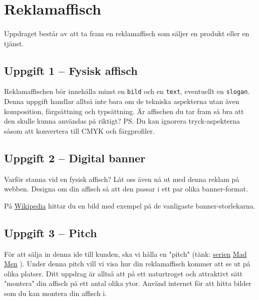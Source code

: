 \documentclass{article}
\begin{document}
  \newpage
  \section{Reklamaffisch}
    \paragraph{}
    Uppdraget består av att ta fram en reklamaffisch som säljer en produkt eller en tjänst.

    \subsection*{ Uppgift 1 -- Fysisk affisch}
      Reklamaffischen bör innehålla minst en \texttt{bild} och en \texttt{text}, eventuellt en \texttt{slogan}. Denna uppgift handlar alltså inte bara om de tekniska aspekterna utan även komposition, färgsättning och typsättning. Är affischen du tar fram så bra att den skulle kunna användas på riktigt? PS. Du kan ignorera tryck-aspekterna såsom att konvertera till CMYK och färgprofiler.

    \subsection*{ Uppgift 2 -- Digital banner}
     Varför stanna vid en fysisk affisch? Låt oss även nå ut med denna reklam på webben. Designa om din affisch så att den passar i ett par olika banner-format.

     På
      \href{http://en.wikipedia.org/wiki/Web_banner}{Wikipedia}
      hittar du en bild med exempel på de vanligaste banner-storlekarna.

    \subsection*{ Uppgift 3 -- Pitch}
      För att sälja in denna ide till kunden, ska vi hålla en "pitch" (tänk: 
      \href{http://www.vh1.com/celebrity/bwe/images/2008/12/Mad%20Men%20Popsicles.jpg}{serien}
      \href{http://feedingkat.typepad.com/.a/6a01127917a2cc28a40120a5a83e9f970b-800wi}{Mad}
      \href{http://farm2.static.flickr.com/1256/912519581_f241225aa2.jpg}{Men}
      ). Under denna pitch vill vi visa hur din reklamaffisch kommer att se ut på olika platser. Ditt uppdrag är alltså att på ett naturtroget och attraktivt sätt "montera" din affisch på ett antal olika ytor. Använd internet för att hitta bilder som du kan montera din affisch i.
\end{document}
